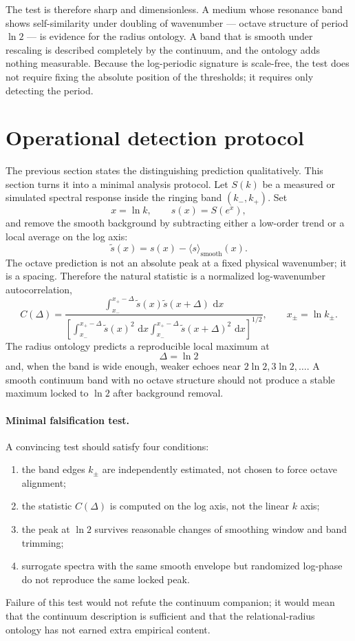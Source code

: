 \documentclass[11pt,a4paper]{article}
\newcommand{\dd}{\,\mathrm{d}}
\begin{document}
The test is therefore sharp and dimensionless. A medium whose resonance band shows self-similarity under doubling of wavenumber --- octave structure of period $\ln 2$ --- is evidence for the radius ontology. A band that is smooth under rescaling is described completely by the continuum, and the ontology adds nothing measurable. Because the log-periodic signature is scale-free, the test does not require fixing the absolute position of the thresholds; it requires only detecting the period.


\section{Operational detection protocol}\label{sec:detection}

The previous section states the distinguishing prediction qualitatively. This section turns it into a minimal analysis protocol. Let $S(k)$ be a measured or simulated spectral response inside the ringing band $(k_-,k_+)$. Set
\[
x=\ln k,\qquad s(x)=S(e^x),
\]
and remove the smooth background by subtracting either a low-order trend or a local average on the log axis:
\[
\tilde s(x)=s(x)-\langle s\rangle_{\mathrm{smooth}}(x).
\]
The octave prediction is not an absolute peak at a fixed physical wavenumber; it is a spacing. Therefore the natural statistic is a normalized log-wavenumber autocorrelation,
\[
C(\Delta)=
\frac{
\int_{x_-}^{x_+-\Delta}\tilde s(x)\tilde s(x+\Delta)\,\dd x
}{
\left[
\int_{x_-}^{x_+-\Delta}\tilde s(x)^2\,\dd x
\int_{x_-}^{x_+-\Delta}\tilde s(x+\Delta)^2\,\dd x
\right]^{1/2}
},
\qquad x_\pm=\ln k_\pm .
\]
The radius ontology predicts a reproducible local maximum at
\[
\Delta=\ln 2
\]
and, when the band is wide enough, weaker echoes near $2\ln2,3\ln2,\dots$. A smooth continuum band with no octave structure should not produce a stable maximum locked to $\ln2$ after background removal.

\paragraph{Minimal falsification test.}
A convincing test should satisfy four conditions:
\begin{enumerate}[label=(\roman*)]
\item the band edges $k_\pm$ are independently estimated, not chosen to force octave alignment;
\item the statistic $C(\Delta)$ is computed on the log axis, not the linear $k$ axis;
\item the peak at $\ln2$ survives reasonable changes of smoothing window and band trimming;
\item surrogate spectra with the same smooth envelope but randomized log-phase do not reproduce the same locked peak.
\end{enumerate}
Failure of this test would not refute the continuum companion; it would mean that the continuum description is sufficient and that the relational-radius ontology has not earned extra empirical content.
\end{document}
